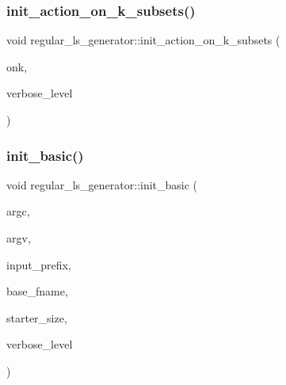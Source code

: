 \subsubsection{\texorpdfstring{init\+\_\+action\+\_\+on\+\_\+k\+\_\+subsets()}{init\_action\_on\_k\_subsets()}}
{\footnotesize\ttfamily void regular\+\_\+ls\+\_\+generator\+::init\+\_\+action\+\_\+on\+\_\+k\+\_\+subsets (\begin{DoxyParamCaption}\item[{\mbox{\hyperlink{galois_8h_a09fddde158a3a20bd2dcadb609de11dc}{I\+NT}}}]{onk,  }\item[{\mbox{\hyperlink{galois_8h_a09fddde158a3a20bd2dcadb609de11dc}{I\+NT}}}]{verbose\+\_\+level }\end{DoxyParamCaption})}

\mbox{\label{classregular__ls__generator_a2524357da0ab4acaa6cac1f128ad7992}} 
\subsubsection{\texorpdfstring{init\+\_\+basic()}{init\_basic()}}
{\footnotesize\ttfamily void regular\+\_\+ls\+\_\+generator\+::init\+\_\+basic (\begin{DoxyParamCaption}\item[{int}]{argc,  }\item[{const char $\ast$$\ast$}]{argv,  }\item[{const \mbox{\hyperlink{galois_8h_ab6cc7b4aeb6ea31aba2b3fbfc83ff5e6}{B\+Y\+TE}} $\ast$}]{input\+\_\+prefix,  }\item[{const \mbox{\hyperlink{galois_8h_ab6cc7b4aeb6ea31aba2b3fbfc83ff5e6}{B\+Y\+TE}} $\ast$}]{base\+\_\+fname,  }\item[{\mbox{\hyperlink{galois_8h_a09fddde158a3a20bd2dcadb609de11dc}{I\+NT}}}]{starter\+\_\+size,  }\item[{\mbox{\hyperlink{galois_8h_a09fddde158a3a20bd2dcadb609de11dc}{I\+NT}}}]{verbose\+\_\+level }\end{DoxyParamCaption})}

\mbox{\label{classregular__ls__generator_ad2d853778456c12a007b975c38f60ab3}} 
